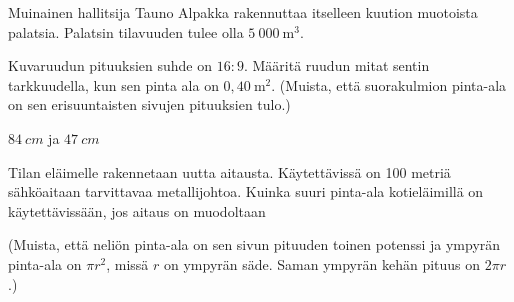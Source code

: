 \begin{tehtavasivu}
\begin{tehtava}
Muinainen hallitsija Tauno Alpakka rakennuttaa itselleen kuution muotoista palatsia.  Palatsin tilavuuden tulee olla $5~000~\mathrm{m}^3$. 
\begin{alakohdat}
\end{alakohdat}
\begin{vastaus}
\begin{alakohdat}
\end{alakohdat}
\end{vastaus}
\end{tehtava}

\begin{tehtava}%
Kuvaruudun pituuksien suhde on $16:9$. Määritä ruudun mitat sentin tarkkuudella, kun sen pinta ala on \(0,40\ \mathrm{m}^2\). (Muista, että suorakulmion pinta-ala on sen erisuuntaisten sivujen pituuksien tulo.)
\begin{vastaus}
$84\ cm$ ja $47\ cm$
\end{vastaus}
\end{tehtava}

\begin{tehtava}%
Tilan eläimelle rakennetaan uutta aitausta. Käytettävissä on 100 metriä sähköaitaan tarvittavaa metallijohtoa. Kuinka suuri pinta-ala kotieläimillä on käytettävissään, jos aitaus on muodoltaan
\begin{alakohdat}
\end{alakohdat}
(Muista, että neliön pinta-ala on sen sivun pituuden toinen potenssi ja ympyrän pinta-ala on \(\pi r^2\), missä \(r\) on ympyrän säde. Saman ympyrän kehän pituus on \(2\pi r\).)
\begin{vastaus}
\begin{alakohdat}
\end{alakohdat}
\end{vastaus}
\end{tehtava}

\end{tehtavasivu}
